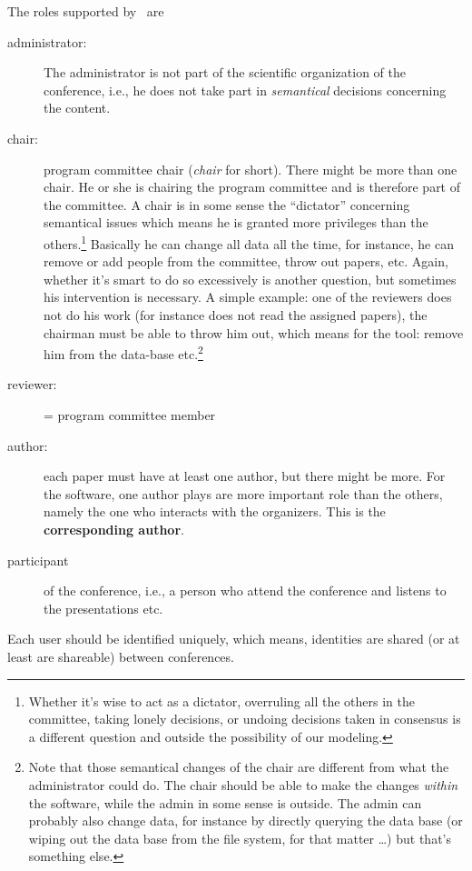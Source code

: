 The roles supported by \Coma\ are
\begin{description}
\item[administrator:] The administrator is not part of the scientific
  organization of the conference, i.e., he does not take part in
  \emph{semantical} decisions concerning the content. 
\item[chair:] program committee chair (\emph{chair} for short). There might
  be more than one chair. He or she is chairing the program committee and
  is therefore part of the committee. A chair is in some sense the
  ``dictator'' concerning semantical issues which means he is granted more
  privileges than the others.\footnote{Whether it's wise to act as a
    dictator, overruling all the others in the committee, taking lonely
    decisions, or undoing decisions taken in consensus is a different
    question and outside the possibility of our modeling.} Basically he
  can change all data all the time, for instance, he can remove or add
  people from the committee, throw out papers, etc. Again, whether it's
  smart to do so excessively is another question, but sometimes his
  intervention is necessary. A simple example: one of the reviewers does
  not do his work (for instance does not read the assigned papers), the
  chairman must be able to throw him out, which means for the tool: remove
  him from the data-base etc.\footnote{Note that those semantical changes
    of the chair are different from what the administrator could do. The
    chair should be able to make the changes \emph{within} the software,
    while the admin in some sense is outside. The admin can probably also
    change data, for instance by directly querying the data base (or wiping
    out the data base from the file system, for that matter \ldots) but
    that's something else.}
\item[reviewer:] = program committee member
\item[author:] each paper must have at least one author, but there might be
  more. For the software, one author plays are more important role than the
  others, namely the one who interacts with the organizers. This is the
  \textbf{corresponding author}.
\item[participant] of the conference, i.e., a person who attend the
  conference and listens to the presentations etc.
\end{description}

Each user should be identified uniquely, which means, identities are shared
(or at least are shareable) between conferences.


